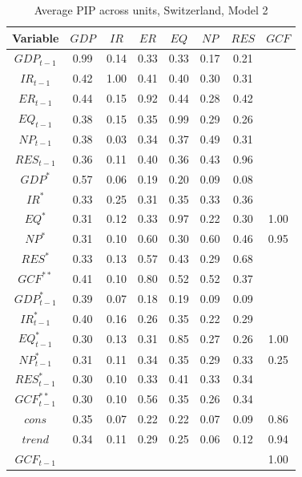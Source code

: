 \documentclass[a4paper, twoside]{templates/ociamthesis}
\begin{document}
\begin{table}[!ht]

\caption{\label{tab:Table55CH2}Average PIP across units, Switzerland, Model 2}
\centering
\fontsize{8}{10}\selectfont
\begin{tabular}[t]{cccccccc}
\toprule
Variable & $GDP$ & $IR$ & $ER$ & $EQ$ & $NP$ & $RES$ & $GCF$\\
\midrule
$GDP_{t-1}$ & 0.99 & 0.14 & 0.33 & 0.33 & 0.17 & 0.21 & \\
$IR_{t-1}$ & 0.42 & 1.00 & 0.41 & 0.40 & 0.30 & 0.31 & \\
$ER_{t-1}$ & 0.44 & 0.15 & 0.92 & 0.44 & 0.28 & 0.42 & \\
$EQ_{t-1}$ & 0.38 & 0.15 & 0.35 & 0.99 & 0.29 & 0.26 & \\
$NP_{t-1}$ & 0.38 & 0.03 & 0.34 & 0.37 & 0.49 & 0.31 & \\
$RES_{t-1}$ & 0.36 & 0.11 & 0.40 & 0.36 & 0.43 & 0.96 & \\
$GDP^*$ & 0.57 & 0.06 & 0.19 & 0.20 & 0.09 & 0.08 & \\
$IR^*$ & 0.33 & 0.25 & 0.31 & 0.35 & 0.33 & 0.36 & \\
$EQ^*$ & 0.31 & 0.12 & 0.33 & 0.97 & 0.22 & 0.30 & 1.00\\
$NP^*$ & 0.31 & 0.10 & 0.60 & 0.30 & 0.60 & 0.46 & 0.95\\
$RES^*$ & 0.33 & 0.13 & 0.57 & 0.43 & 0.29 & 0.68 & \\
$GCF^{**}$ & 0.41 & 0.10 & 0.80 & 0.52 & 0.52 & 0.37 & \\
$GDP^*_{t-1}$ & 0.39 & 0.07 & 0.18 & 0.19 & 0.09 & 0.09 & \\
$IR^*_{t-1}$ & 0.40 & 0.16 & 0.26 & 0.35 & 0.22 & 0.29 & \\
$EQ^*_{t-1}$ & 0.30 & 0.13 & 0.31 & 0.85 & 0.27 & 0.26 & 1.00\\
$NP^*_{t-1}$ & 0.31 & 0.11 & 0.34 & 0.35 & 0.29 & 0.33 & 0.25\\
$RES^*_{t-1}$ & 0.30 & 0.10 & 0.33 & 0.41 & 0.33 & 0.34 & \\
$GCF^{**}_{t-1}$ & 0.30 & 0.10 & 0.56 & 0.35 & 0.26 & 0.34 & \\
$cons$ & 0.35 & 0.07 & 0.22 & 0.22 & 0.07 & 0.09 & 0.86\\
$trend$ & 0.34 & 0.11 & 0.29 & 0.25 & 0.06 & 0.12 & 0.94\\
$GCF_{t-1}$ &  &  &  &  &  &  & 1.00\\
\bottomrule
\end{tabular}
\end{table}
\end{document}
